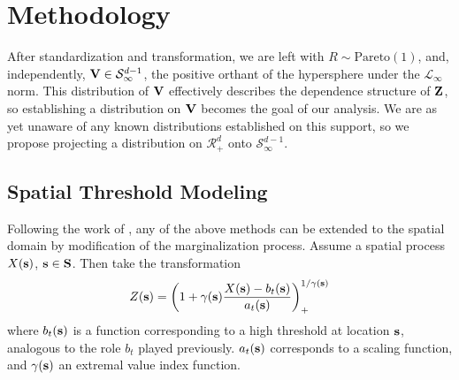 \section{Methodology}

After standardization and transformation, we are left with $R\sim\text{Pareto}(1)$, and, independently,
  ${\bf V}\in\mathcal{S}_{\infty}^{d-1}$, the positive orthant of the hypersphere under the
  $\mathcal{L}_{\infty}$ norm.  This distribution of ${\bf V}$ effectively describes the dependence
  structure of ${\bf Z}$, so establishing a distribution on ${\bf V}$ becomes the goal of our analysis.
  We are as yet unaware of any known distributions established on this support, so we propose projecting
  a distribution on $\mathcal{R}_{+}^{d}$ onto $\mathcal{S}_{\infty}^{d-1}$.











\subsection{Spatial Threshold Modeling}
Following the work of \cite{ferreira2014}, any of the above methods can be
  extended to the spatial domain by modification of the marginalization process.
  Assume a spatial process $X({\bf s})$, ${\bf s}\in {\bf S}$.  Then take the
  transformation
\begin{equation}
  \label{eqn:spatial}
  Z({\bf s}) = \left(1 + \gamma({\bf s})\frac{X({\bf s}) - b_t({\bf s})}{a_t({\bf s})}\right)_{+}^{1/{\gamma({\bf s})}}
\end{equation}
  where $b_t({\bf s})$ is a function corresponding to a high threshold at location
  ${\bf s}$, analogous to the role $b_t$ played previously. $a_t({\bf s})$
  corresponds to a scaling function, and $\gamma({\bf s})$ an extremal value index
  function.

